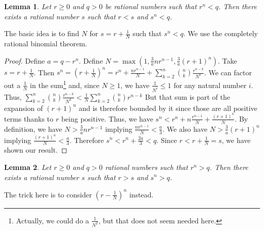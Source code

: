 \documentclass[12pt]{article}
\newtheorem{lemma}{Lemma}[subsection]
\begin{document}
\begin{lemma}\label{app:lesser}
Let $r \geq 0 $ and $q > 0$ be rational numbers such that $r^n < q$. Then there exists a rational number $s$ such that $r < s$ and $s^n < q$.
\end{lemma}

The basic idea is to find $N$ for $s = r + \tfrac{1}{N}$ such that $s^n < q$. We use the completely rational binomial theorem.  

\begin{proof}
Define $a = q - r^n$. Define $N =  \max(1,\tfrac{3}{a}n r^{n-1}, \tfrac{3}{a}(r+1)^n)$.  Take $s = r + \tfrac{1}{N}$. Then $s^n = (r+ \tfrac{1}{N})^n = r^n + \tfrac{n r^{n-1}}{N} + \sum_{k=2}^{n} \binom{n}{k} \tfrac{r^{n-k}}{N^k}$. We can factor out a $\tfrac{1}{N}$ in the sum\footnote{Actually, we could do a $\frac{1}{N^2}$, but that does not seem needed here.} and, since $N \geq 1$, we have $\tfrac{1}{N^i} \leq  1$ for any natural number $i$. Thus, $\sum_{k=2}^{n} \binom{n}{k} \tfrac{r^{n-k}}{N^k} < \tfrac{1}{N} \sum_{k=2}^{n} \binom{n}{k} r^{n-k}$  But that sum is part of the expansion of $(r+1)^n$ and is therefore bounded by it since those are all positive terms thanks to $r$ being positive. Thus, we have $s^n < r^n + n \tfrac{r^{n-1}}{N} + \tfrac{ (r+1)^n }{N}$.  By definition, we have $N > \tfrac{3}{a} n r^{n-1}$ implying $\tfrac{ n r^{n-1}}{N} < \tfrac{a}{3}$. We also have $N > \tfrac{3}{a} (r+1)^n$ implying $ \tfrac{(r+1)^n}{N} < \tfrac{a}{3}$. Therefore $s^n < r^n + \tfrac{2 a}{3} < q$. Since $r< r + \frac{1}{N} = s$, we have shown our result. 
\end{proof}

\begin{lemma}\label{app:greater}
Let $r \geq 0 $ and $q > 0$ rational numbers such that $r^n > q$. Then there exists a rational number $s$ such that $r > s$ and $s^n > q$.
\end{lemma}

The trick here is to consider $(r-\tfrac{1}{N})^n$ instead. 
\end{document}
